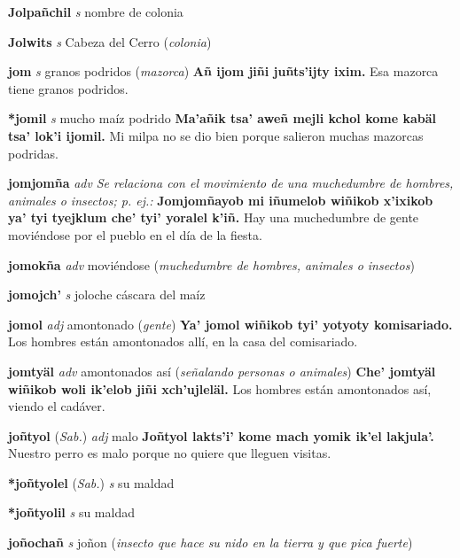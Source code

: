 \documentclass[10pt]{scrbook}
\newcommand{\entry}[1]{\textbf{#1}}
\newcommand{\nontranslationdef}[1]{\textit{#1}}
\newcommand{\partofspeech}[1]{\textit{#1}}
\newcommand{\spanishtranslation}[1]{#1}
\newcommand{\clarification}[1]{(\textit{#1})}
\newcommand{\cholexample}[1]{\textbf{#1}}
\newcommand{\exampletranslation}[1]{#1}
\newcommand{\relevantdialect}[1]{(\textit{#1})}
\begin{document}
\begin{multicols}{2}
\entry{Jolpañchil}
\partofspeech{s}
\spanishtranslation{nombre de colonia}

\entry{Jolwits}
\partofspeech{s}
\spanishtranslation{Cabeza del Cerro}
\clarification{colonia}

\entry{jom}
\partofspeech{s}
\spanishtranslation{granos podridos}
\clarification{mazorca}
\cholexample{Añ ijom jiñi juñts'ijty ixim.}
\exampletranslation{Esa mazorca tiene granos podridos.}

\entry{*jomil}
\partofspeech{s}
\spanishtranslation{mucho maíz podrido}
\cholexample{Ma'añik tsa' aweñ mejli kchol kome kabäl tsa' lok'i ijomil.}
\exampletranslation{Mi milpa no se dio bien porque salieron muchas mazorcas podridas.}

\entry{jomjomña}
\partofspeech{adv}
\nontranslationdef{Se relaciona con el movimiento de una muchedumbre de hombres, animales o insectos; p. ej.:}
\cholexample{Jomjomñayob mi iñumelob wiñikob x'ixikob ya' tyi tyejklum che' tyi' yoralel k'iñ.}
\exampletranslation{Hay una muchedumbre de gente moviéndose por el pueblo en el día de la fiesta.}

\entry{jomokña}
\partofspeech{adv}
\spanishtranslation{moviéndose}
\clarification{muchedumbre de hombres, animales o insectos}

\entry{jomojch'}
\partofspeech{s}
\spanishtranslation{joloche}
\spanishtranslation{cáscara del maíz}

\entry{jomol}
\partofspeech{adj}
\spanishtranslation{amontonado}
\clarification{gente}
\cholexample{Ya' jomol wiñikob tyi' yotyoty komisariado.}
\exampletranslation{Los hombres están amontonados allí, en la casa del comisariado.}

\entry{jomtyäl}
\partofspeech{adv}
\spanishtranslation{amontonados así}
\clarification{señalando personas o animales}
\cholexample{Che' jomtyäl wiñikob woli ik'elob jiñi xch'ujleläl.}
\exampletranslation{Los hombres están amontonados así, viendo el cadáver.}

\entry{joñtyol}
\relevantdialect{Sab.}
\partofspeech{adj}
\spanishtranslation{malo}
\cholexample{Joñtyol lakts'i' kome mach yomik ik'el lakjula'.}
\exampletranslation{Nuestro perro es malo porque no quiere que lleguen visitas.}

\entry{*joñtyolel}
\relevantdialect{Sab.}
\partofspeech{s}
\spanishtranslation{su maldad}

\entry{*joñtyolil}
\partofspeech{s}
\spanishtranslation{su maldad}

\entry{joñochañ}
\partofspeech{s}
\spanishtranslation{joñon}
\clarification{insecto que hace su nido en la tierra y que pica fuerte}


\end{multicols}
\end{document}
